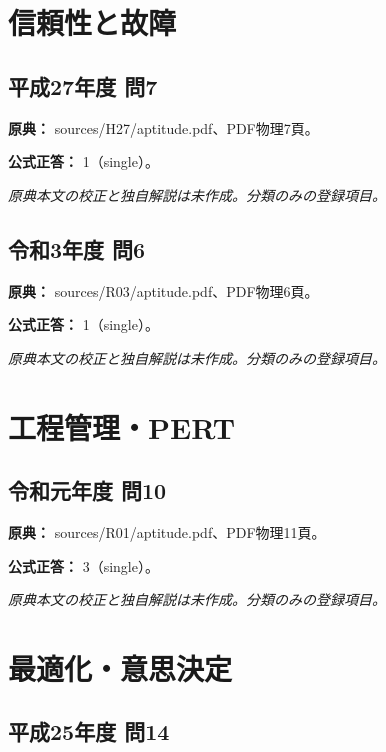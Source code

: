 \section{信頼性と故障}

\subsection{平成27年度 問7}
\label{q:h27-reg-apt-07}

\noindent\textbf{原典：} sources/H27/aptitude.pdf、PDF物理7頁。

\textbf{公式正答：} 1（single）。

\par\textit{原典本文の校正と独自解説は未作成。分類のみの登録項目。}

\subsection{令和3年度 問6}
\label{q:r03-reg-apt-06}

\noindent\textbf{原典：} sources/R03/aptitude.pdf、PDF物理6頁。

\textbf{公式正答：} 1（single）。

\par\textit{原典本文の校正と独自解説は未作成。分類のみの登録項目。}

\section{工程管理・PERT}

\subsection{令和元年度 問10}
\label{q:r01-reg-apt-10}

\noindent\textbf{原典：} sources/R01/aptitude.pdf、PDF物理11頁。

\textbf{公式正答：} 3（single）。

\par\textit{原典本文の校正と独自解説は未作成。分類のみの登録項目。}

\section{最適化・意思決定}

\subsection{平成25年度 問14}
\label{q:h25-reg-apt-14}

